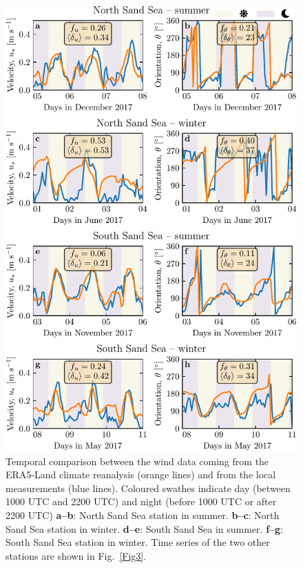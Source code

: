\begin{figure}
\centering
\includegraphics[scale=1]{Figures/Figure5.pdf}
\caption{Temporal comparison between the wind data coming from the ERA5-Land climate reanalysis (orange lines) and from the local measurements (blue lines). Coloured swathes indicate day (between 1000 UTC and 2200 UTC) and night (before 1000 UTC or after 2200 UTC) \textbf{a--b}: North Sand Sea station in summer. \textbf{b--c}: North Sand Sea station in winter. \textbf{d--e}: South Sand Sea in summer. \textbf{f--g}: South Sand Sea station in winter. Time series of the two other stations are shown in Fig.~\ref{Fig3}.}
\label{Fig5}
\end{figure}

